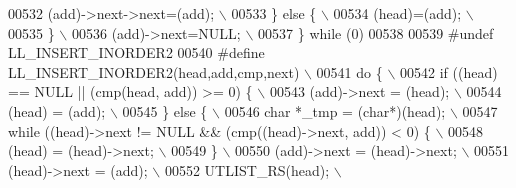 \begin{DoxyCode}
00532 \textcolor{preprocessor}{    (add)->next->next=(add);                                                                   \(\backslash\)}
00533 \textcolor{preprocessor}{  \} else \{                                                                                     \(\backslash\)}
00534 \textcolor{preprocessor}{    (head)=(add);                                                                              \(\backslash\)}
00535 \textcolor{preprocessor}{  \}                                                                                            \(\backslash\)}
00536 \textcolor{preprocessor}{  (add)->next=NULL;                                                                            \(\backslash\)}
00537 \textcolor{preprocessor}{\} while (0)}
00538 
00539 \textcolor{preprocessor}{#undef LL\_INSERT\_INORDER2}
00540 \textcolor{preprocessor}{#define LL\_INSERT\_INORDER2(head,add,cmp,next)                                                  \(\backslash\)}
00541 \textcolor{preprocessor}{do \{                                                                                           \(\backslash\)}
00542 \textcolor{preprocessor}{  if ((head) == NULL || (cmp(head, add)) >= 0) \{                                               \(\backslash\)}
00543 \textcolor{preprocessor}{    (add)->next = (head);                                                                      \(\backslash\)}
00544 \textcolor{preprocessor}{    (head) = (add);                                                                            \(\backslash\)}
00545 \textcolor{preprocessor}{  \} else \{                                                                                     \(\backslash\)}
00546 \textcolor{preprocessor}{    char *\_tmp = (char*)(head);                                                                \(\backslash\)}
00547 \textcolor{preprocessor}{    while ((head)->next != NULL && (cmp((head)->next, add)) < 0) \{                             \(\backslash\)}
00548 \textcolor{preprocessor}{      (head) = (head)->next;                                                                   \(\backslash\)}
00549 \textcolor{preprocessor}{    \}                                                                                          \(\backslash\)}
00550 \textcolor{preprocessor}{    (add)->next = (head)->next;                                                                \(\backslash\)}
00551 \textcolor{preprocessor}{    (head)->next = (add);                                                                      \(\backslash\)}
00552 \textcolor{preprocessor}{    UTLIST\_RS(head);                                                                           \(\backslash\)}

\end{DoxyCode}
